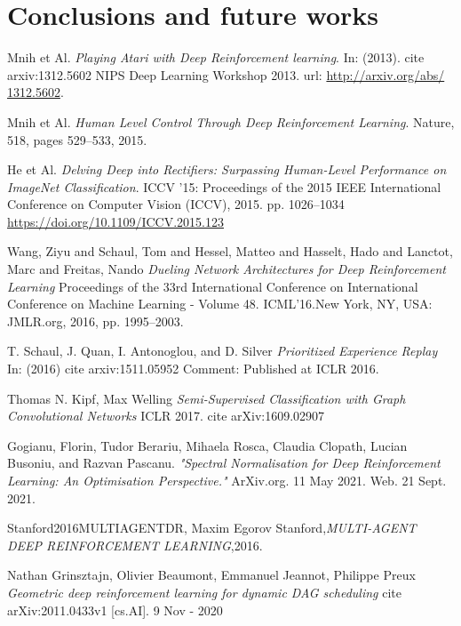 \documentclass[a4paper,14pt]{extreport}
\begin{document}
\chapter{Conclusions and future works}




\begin{thebibliography}{9}

	
	Mnih et Al.
	\textit{Playing Atari with Deep Reinforcement learning}. 
	In: (2013). cite arxiv:1312.5602 
	NIPS Deep Learning Workshop 2013. url: \url{http://arxiv.org/abs/
	1312.5602}.
	
	Mnih et Al.
	\textit{Human Level Control Through Deep Reinforcement Learning}. 
	Nature, 518, pages 529–533, 2015.

	He et Al.
	\textit{Delving Deep into Rectifiers: Surpassing Human-Level Performance on ImageNet Classification}. 
	 ICCV '15: Proceedings of the 2015 IEEE International Conference on Computer Vision (ICCV), 2015.
	 pp. 1026–1034 \url{https://doi.org/10.1109/ICCV.2015.123}
	 
	 Wang, Ziyu and Schaul, Tom and Hessel, Matteo and Hasselt, Hado and Lanctot, Marc and Freitas, Nando
	 \textit{Dueling Network Architectures for Deep Reinforcement Learning}
	 Proceedings of the 33rd International Conference on International Conference on Machine Learning - Volume 48.
	 ICML’16.New York, NY, USA: JMLR.org, 2016, pp. 1995–2003.
	 
	 T. Schaul, J. Quan, I. Antonoglou, and D. Silver
	 \textit{Prioritized Experience Replay}
	 In: (2016) cite arxiv:1511.05952
	 Comment: Published at ICLR 2016.
	 
	 Thomas N. Kipf, Max Welling
	 \textit{Semi-Supervised Classification with Graph Convolutional Networks}
	 ICLR 2017. cite arXiv:1609.02907

	Gogianu, Florin, Tudor Berariu, Mihaela Rosca, Claudia Clopath, Lucian Busoniu, and Razvan Pascanu. \textit{"Spectral Normalisation for Deep Reinforcement Learning: An Optimisation Perspective."} ArXiv.org. 11 May 2021. Web. 21 Sept. 2021.
	
	Stanford2016MULTIAGENTDR,
	Maxim Egorov Stanford,\textit{MULTI-AGENT DEEP REINFORCEMENT LEARNING},2016.
	
	 Nathan Grinsztajn, Olivier Beaumont, Emmanuel Jeannot, Philippe Preux
	 \textit{Geometric deep reinforcement learning for dynamic DAG scheduling}
	 cite arXiv:2011.0433v1 [cs.AI]. 9 Nov - 2020
	


\end{thebibliography}
\end{document}
